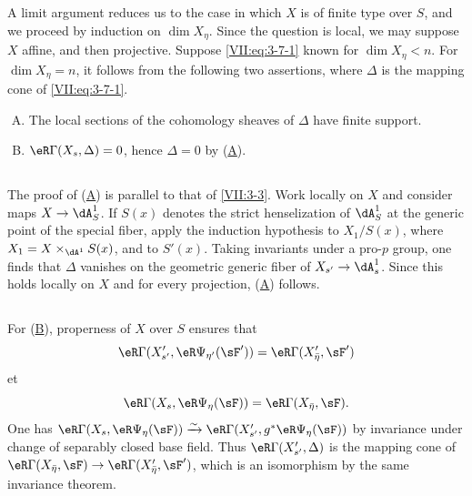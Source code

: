 \documentclass[12pt,oneside,english]{smfbook}
\newcommand{\iso}{\xrightarrow\sim}
\begin{document}
A limit argument reduces us to the case in which $X$ is of finite type over $S$, and we proceed by induction on $\dim X_\eta$. Since the question is local, we may suppose $X$ affine, and then projective. Suppose \eqref{VII:eq:3-7-1} known for $\dim X_\eta<n$. For $\dim X_\eta=n$, it follows from the following two assertions, where $\Delta$ is the mapping cone of \eqref{VII:eq:3-7-1}.

\begin{enumerate}[(A)]
  \item The local sections of the cohomology sheaves of $\Delta$ have finite support. \hypertarget{VII:3-A}{}
  \item $\eR\Gamma(X_s,\Delta)=0$, hence $\Delta=0$ by (\hyperlink{VII:3-A}{A}). \hypertarget{VII:3-B}{}
\end{enumerate}

\subsection{}\label{VII:3-8}

The proof of (\hyperlink{VII:3-A}{A}) is parallel to that of \ref{VII:3-3}. Work locally on $X$ and consider maps $X\to\dA_S^1$. If $S(x)$ denotes the strict henselization of $\dA_S^1$ at the generic point of the special fiber, apply the induction hypothesis to $X_1/S(x)$, where $X_1=X\times_{\dA^1}S(x)$, and to $S'(x)$. Taking invariants under a pro-$p$ group, one finds that $\Delta$ vanishes on the geometric generic fiber of $X_{s'}\to\dA_s^1$. Since this holds locally on $X$ and for every projection, (\hyperlink{VII:3-A}{A}) follows.

\subsection{}\label{VII:3-9}

For (\hyperlink{VII:3-B}{B}), properness of $X$ over $S$ ensures that
\[
  \eR\Gamma(X_{s'}',\eR\Psi_{\eta'}(\sF')) = \eR\Gamma(X_{\bar\eta}',\sF')
\]
et
\[
  \eR\Gamma(X_s,\eR\Psi_\eta(\sF)) = \eR\Gamma(X_{\bar\eta},\sF) \text{.}
\]
One has $\eR\Gamma(X_s,\eR\Psi_\eta(\sF))\iso \eR\Gamma(X_{s'}',g^\ast\eR\Psi_\eta(\sF))$ by invariance under change of separably closed base field. Thus $\eR\Gamma(X_{s'}',\Delta)$ is the mapping cone of $\eR\Gamma(X_{\bar\eta},\sF)\to \eR\Gamma(X_{\bar\eta}',\sF')$, which is an isomorphism by the same invariance theorem.

\subsection{}\label{VII:3-10}
\end{document}
